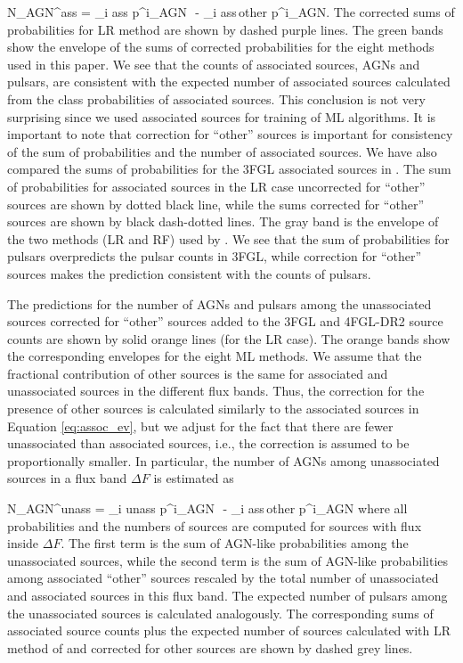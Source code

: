 \be
{}
N_{\rm AGN}^{\rm ass}  = \sum_{i \in \rm ass} p^i_{\rm AGN}\,\, - \sum_{i \in \rm ass\,other} p^i_{\rm AGN}.
\ee
The corrected sums of probabilities for LR method are shown by dashed purple lines.
The green bands show the envelope of the sums of corrected probabilities for the eight methods used in this paper.
We see that the counts of associated sources, AGNs and pulsars, are consistent with the expected number of associated sources
calculated from the class probabilities of associated sources.
This conclusion is not very surprising since we used associated sources for training of ML algorithms.
It is important to note that correction for ``other'' sources is important for consistency of the sum of probabilities and the number of associated sources.
We have also compared the sums of probabilities for the 3FGL associated sources in \cite{2016ApJ...820....8S}.
The sum of probabilities for associated sources in the LR case uncorrected for ``other'' sources are shown by dotted black line,
while the sums corrected for ``other'' sources are shown by black dash-dotted lines.
The gray band is the envelope of the two methods (LR and RF) used by \cite{2016ApJ...820....8S}.
We see that the sum of probabilities for pulsars overpredicts the pulsar counts in 3FGL, 
while correction for ``other'' sources makes the prediction consistent with the counts of pulsars.

The predictions for the number of AGNs and pulsars among the unassociated sources corrected for ``other'' sources 
added to the 3FGL and 4FGL-DR2  source counts are shown by solid orange lines (for the LR case).
The orange bands show the corresponding envelopes for the eight ML methods.
We assume that the fractional contribution of other sources is the same for associated and unassociated sources in the different flux bands.
Thus, the correction for the presence of other sources is calculated similarly to the associated sources in Equation \ref{eq:assoc_ev},
but we adjust for the fact that there are fewer unassociated than associated sources, i.e., 
the correction is assumed to be proportionally smaller.
In particular, the number of AGNs among unassociated sources in a flux band $\Delta F$ is estimated as

\be
{}
N_{\rm AGN}^{\rm unass} = \sum_{i \in \rm unass} p^i_{\rm AGN}\,\, - \sum_{i \in \rm ass\,other} p^i_{\rm AGN} \cdot 
{}
\ee
where all probabilities and the numbers of sources are computed for sources with flux inside $\Delta F$.
The first term is the sum of AGN-like probabilities among the unassociated sources,
while the second term is the sum of AGN-like probabilities among associated ``other'' sources rescaled by the total number
of unassociated and associated sources in this flux band.
The expected number of pulsars among the unassociated sources is calculated analogously.
The corresponding sums of associated source counts plus the expected number of sources calculated with LR method of \cite{2016ApJ...820....8S} 
and corrected for other sources are shown by dashed grey lines.


